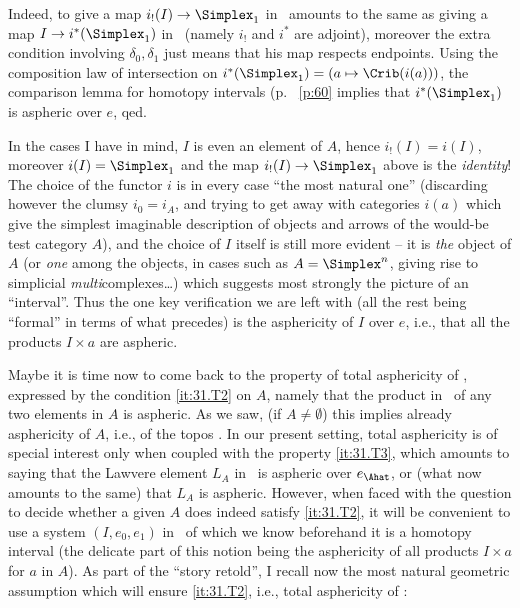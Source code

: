 Indeed, to give a map $i_!(I)\to\Simplex_1$ in \Cat\ amounts to the same
as giving a map $I\to i^*(\Simplex_1)$ in \Ahat\ (namely $i_!$ and $i^*$
are adjoint), moreover the extra condition involving
$\delta_0,\delta_1$ just means that his map respects endpoints. Using
the composition law of intersection on $i^*(\Simplex_1) = (a \mapsto
\Crib(i(a)))$, the comparison lemma for homotopy intervals (p.~%
\ref{p:60} implies that $i^*(\Simplex_1)$ is aspheric over
$e$, qed.

In the cases I have in mind, $I$ is even an element of $A$, hence
$i_!(I)=i(I)$, moreover $i(I)=\Simplex_1$ and the map
$i_!(I)\to\Simplex_1$ above is the \emph{identity}! The choice of the
functor $i$ is in every case ``the most natural one'' (discarding
however the clumsy $i_0=i_A$, and trying to get away with categories
$i(a)$ which give the simplest imaginable description of objects and
arrows of the would-be test category $A$), and the choice of $I$
itself is still more evident -- it is \emph{the} object of $A$ (or
\emph{one} among the objects, in cases such as $A=\Simplex^n$, giving
rise to simplicial \emph{multi}complexes\ldots) which suggests most
strongly the picture of an ``interval''. Thus the one key verification
we are left with (all the rest being ``formal'' in terms of what
precedes) is the asphericity of $I$ over $e$, i.e., that all the
products $I\times a$ are aspheric.

\label{sec:39}%
Maybe it is time now to come back to the property of total asphericity
of \Ahat, expressed by the condition \ref{it:31.T2} on $A$, namely
that the product in \Ahat\ of any two elements in $A$ is aspheric. As
we saw, (if $A \neq \emptyset$) this implies already asphericity of $A$, i.e., of the topos
\Ahat. In our present setting, total asphericity is of special
interest only when coupled with the property \ref{it:31.T3}, which
amounts to saying that the Lawvere element $L_A$ in \Ahat\
is aspheric over $e_\Ahat$, or (what now amounts to the
same) that $L_A$ is aspheric. However, when faced with the question to
decide whether a given $A$ does indeed satisfy \ref{it:31.T2}, it will
be convenient to use a system $(I,e_0,e_1)$ in \Ahat\ of which we know
beforehand it is a homotopy interval (the delicate part of this notion
being the asphericity of all products $I\times a$ for $a$ in $A$). As
part of the ``story retold'', I recall now the most natural geometric
assumption which will ensure \ref{it:31.T2}, i.e., total asphericity
of \Ahat:

